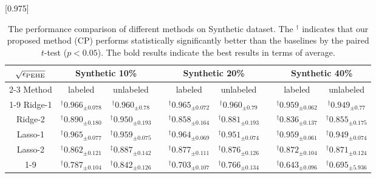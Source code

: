 \begin{table}[tbp]
\caption{The performance comparison of different methods on Synthetic dataset. The $^\dagger$ indicates that our proposed method (CP) performs statistically significantly better than the baselines by the paired $t$-test ($p<0.05$). The bold results indicate the best results in terms of average.}\label{table:synthetic}
\scalebox{0.975}[0.975]
{
\centering
\begin{tabular} {ccccccccc }
\toprule[2pt]
       $ \sqrt{\epsilon_{\rm PEHE}} $         & \multicolumn{2}{c}{ \bf{Synthetic} 10\%}        &              & \multicolumn{2}{c}{\bf{Synthetic} 20\%}& &  \multicolumn{2}{c}{\bf{Synthetic} 40\%}      \\[3pt]\cmidrule{2-3}\cmidrule{5-6}\cmidrule{8-9}
Method                      & labeled & unlabeled & \multicolumn{1}{l}{} & labeled & unlabeled & \multicolumn{1}{l}{} & labeled & unlabeled\\[3pt] \cmidrule{1-9}
Ridge-1   &        $^\dagger0.966_{\pm{0.078}}$ &  $^\dagger0.960_{\pm{0.78}}$ & \multicolumn{1}{l}{} &   $^\dagger0.965_{\pm{0.072}}$  &  $^\dagger0.960_{\pm{0.79}}$       &   & $^\dagger0.959_{\pm{0.062}}$ &  $^\dagger0.949_{\pm{0.77}}$      \\[3pt]
Ridge-2   &        $^\dagger0.890_{\pm{0.180}}$  &  $^\dagger0.950_{\pm{0.193}}$       & \multicolumn{1}{l}{}
&  $^\dagger0.858_{\pm{0.164}}$  &    $^\dagger0.881_{\pm{0.193}}$  &   &  $^\dagger0.836_{\pm{0.137}}$ & $^\dagger0.855_{\pm{0.175}}$      \\[3pt]

Lasso-1   &        $^\dagger0.965_{\pm{0.077}}$       &       $^\dagger0.959_{\pm{0.075}}$         & \multicolumn{1}{l}{} &        $^\dagger0.964_{\pm{0.069}}$       &  $^\dagger0.951_{\pm{0.074}}$       &     &   $^\dagger0.959_{\pm{0.061}}$ &  $^\dagger0.949_{\pm{0.074}}$  \\[3pt]

Lasso-2   &        $^\dagger0.862_{\pm{0.121}}$       &       $^\ddagger0.887_{\pm{0.142}}$         & \multicolumn{1}{l}{} &         $^\dagger0.877_{\pm{0.111}}$    &  $^\dagger0.876_{\pm{0.126}}$       &  &   $^\dagger0.872_{\pm{0.104}}$& $^\dagger0.871_{\pm{0.124}}$     \\[3pt]\cmidrule{1-9}

\multicolumn{1}{c}{$k$NN} &        $^\dagger0.787_{\pm{0.104}}$  &  $^\dagger0.842_{\pm{0.126}}$         & \multicolumn{1}{l}{} &      $^\dagger0.703_{\pm{0.107}}$     &    $^\dagger0.766_{\pm{0.134}}$     &  &   $^\dagger0.643_{\pm{0.096}}$ & $^\dagger0.695_{\pm{5.936}}$  \\[3pt]


\end{tabular}}
\end{table}
